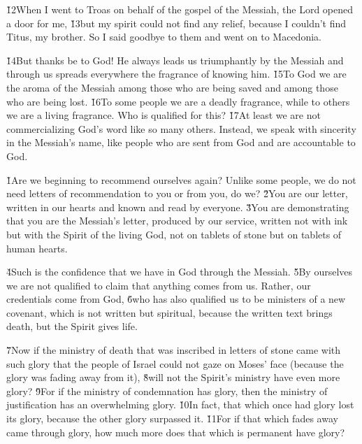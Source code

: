\v{12}When I went to Troas on behalf of the gospel of the Messiah, the Lord opened a door for me, \v{13}but my spirit could not find any relief, because I couldn't find Titus, my brother. So I said goodbye to them and went on to Macedonia.

\v{14}But thanks be to God! He always leads us triumphantly by the Messiah and through us spreads everywhere the fragrance of knowing him. \v{15}To God we are the aroma of the Messiah among those who are being saved and among those who are being lost. \v{16}To some people we are a deadly fragrance, while to others we are a living fragrance. Who is qualified for this? \v{17}At least we are not commercializing God's word like so many others. Instead, we speak with sincerity in the Messiah's name, like people who are sent from God and are accountable to God.

\v{1}Are we beginning to recommend ourselves again? Unlike some people, we do not need letters of recommendation to you or from you, do we? \v{2}You are our letter, written in our hearts and known and read by everyone. \v{3}You are demonstrating that you are the Messiah's letter, produced by our service, written not with ink but with the Spirit of the living God, not on tablets of stone but on tablets of human hearts.

\v{4}Such is the confidence that we have in God through the Messiah. \v{5}By ourselves we are not qualified to claim that anything comes from us. Rather, our credentials come from God, \v{6}who has also qualified us to be ministers of a new covenant, which is not written but spiritual, because the written text brings death, but the Spirit gives life.

\v{7}Now if the ministry of death that was inscribed in letters of stone came with such glory that the people of Israel could not gaze on Moses' face (because the glory was fading away from it), \v{8}will not the Spirit's ministry have even more glory? \v{9}For if the ministry of condemnation has glory, then the ministry of justification has an overwhelming glory. \v{10}In fact, that which once had glory lost its glory, because the other glory surpassed it. \v{11}For if that which fades away came through glory, how much more does that which is permanent have glory?

